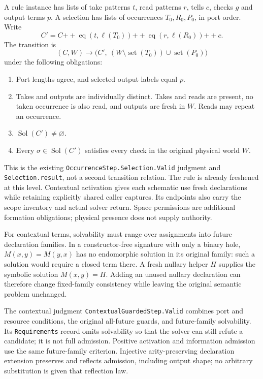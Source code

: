 \documentclass[11pt]{article}
\newcommand{\Sol}{\operatorname{Sol}}
\newcommand{\code}[1]{\texttt{\small #1}}
\begin{document}
A rule instance has lists of take patterns $t$, read patterns $r$, tells
$c$, checks $g$ and output terms $p$. A selection has lists of occurrences
$T_0,R_0,P_0$, in port order. Write
\[
 C' = C \mathbin{+\!+} \operatorname{eq}(t,\ell(T_0))
        \mathbin{+\!+} \operatorname{eq}(r,\ell(R_0))
        \mathbin{+\!+} c .
\]
The transition is
\[
 (C,W)\longrightarrow
 \bigl(C',\ (W\setminus\operatorname{set}(T_0))\cup
                         \operatorname{set}(P_0)\bigr)
\]
under the following obligations:
\begin{enumerate}
\item Port lengths agree, and selected output labels equal $p$.
\item Takes and outputs are individually distinct. Takes and reads are
present, no taken occurrence is also read, and outputs are fresh in $W$.
Reads may repeat an occurrence.
\item $\Sol(C')\ne\varnothing$.
\item Every $\sigma\in\Sol(C')$ satisfies every check in the original
physical world $W$.
\end{enumerate}

This is the existing \code{OccurrenceStep.Selection.Valid} judgment and
\code{Selection.result}, not a second transition relation. The rule is
already freshened at this level. Contextual activation gives each schematic
use fresh declarations while retaining explicitly shared caller captures.
Its endpoints also carry the scope inventory and actual solver return.
Space permissions are additional formation obligations; physical presence
does not supply authority.

For contextual terms, solvability must range over assignments into future
declaration families. In a constructor-free signature with only a binary
hole, $M(x,y)=M(y,x)$ has no endomorphic solution in its original family:
such a solution would require a closed term there. A fresh nullary helper
$H$ supplies the symbolic solution $M(x,y)=H$. Adding an unused nullary
declaration can therefore change fixed-family consistency while leaving
the original semantic problem unchanged.

The contextual judgment \code{ContextualGuardedStep.Valid} combines port
and resource conditions, the original all-future guards, and future-family
solvability. Its \code{Requirements} record omits solvability so that the
solver can still refute a candidate; it is not full admission. Positive
activation and information admission use the same future-family criterion.
Injective arity-preserving declaration extension preserves and reflects
admission, including output shape; no arbitrary substitution is given that
reflection law.
\end{document}
